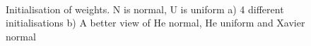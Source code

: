 \documentclass[../main.tex]{subfiles}
\begin{document}
\begin{figure}%
    \centering
    \\
    \caption{Initialisation of weights. N is normal, U is uniform a) 4 different initialisations b) A better view of He normal, He uniform and Xavier normal}%
    \label{fig:init_X_and_He}%
\end{figure}

\end{document}
